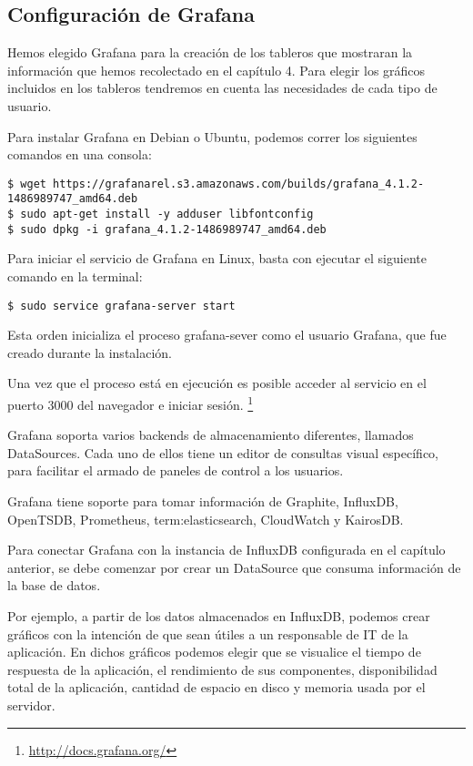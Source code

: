 \subsection{Configuración de Grafana}
\label{configuracion-de-grafana}

Hemos elegido Grafana para la creación de los tableros que mostraran la información que hemos recolectado en el capítulo 4. Para elegir los gráficos incluidos en los tableros tendremos en cuenta las necesidades de cada tipo de usuario.

Para instalar Grafana en Debian o Ubuntu, podemos correr los siguientes comandos en una consola:

\begin{lstlisting}
$ wget https://grafanarel.s3.amazonaws.com/builds/grafana_4.1.2-1486989747_amd64.deb
$ sudo apt-get install -y adduser libfontconfig
$ sudo dpkg -i grafana_4.1.2-1486989747_amd64.deb
\end{lstlisting}

Para iniciar el servicio de Grafana en Linux, basta con ejecutar el siguiente comando en la terminal:

\begin{lstlisting}
$ sudo service grafana-server start
\end{lstlisting}


Esta orden inicializa el proceso grafana-sever como el usuario Grafana, que fue creado durante la instalación.

Una vez que el proceso está en ejecución es posible acceder al servicio en el puerto 3000 del navegador e iniciar sesión. \footnote{\url{http://docs.grafana.org/}}

Grafana soporta varios backends de almacenamiento diferentes, llamados DataSources. Cada uno de ellos tiene un editor de consultas visual específico, para facilitar el armado de paneles de control a los usuarios.

Grafana tiene soporte para tomar información de Graphite, InfluxDB, OpenTSDB, Prometheus, \gls{term:elasticsearch}, CloudWatch y KairosDB.

Para conectar Grafana con la instancia de InfluxDB configurada en el capítulo anterior, se debe comenzar por crear un DataSource que consuma información de la base de datos.



Por ejemplo, a partir de los datos almacenados en InfluxDB, podemos crear gráficos con la intención de que sean útiles a un responsable de IT de la aplicación. En dichos gráficos podemos elegir que se visualice el tiempo de respuesta de la aplicación, el rendimiento de sus componentes, disponibilidad total de la aplicación, cantidad de espacio en disco y memoria usada por el servidor.

